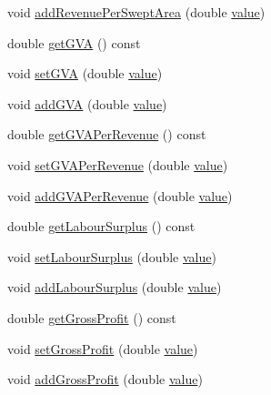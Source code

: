 \begin{DoxyCompactItemize}
\item 
void \mbox{\hyperlink{class_vessel_data_a580e5d2800b1996a473504df4294fd52}{add\+Revenue\+Per\+Swept\+Area}} (double \mbox{\hyperlink{diffusion_8cpp_a4b41795815d9f3d03abfc739e666d5da}{value}})
\item 
double \mbox{\hyperlink{class_vessel_data_ae6043198db6a2a6207ac4c7094efd4ac}{get\+G\+VA}} () const
\item 
void \mbox{\hyperlink{class_vessel_data_a0514e238c51f7f7f500a5c57b6a8ce44}{set\+G\+VA}} (double \mbox{\hyperlink{diffusion_8cpp_a4b41795815d9f3d03abfc739e666d5da}{value}})
\item 
void \mbox{\hyperlink{class_vessel_data_a9d48860436ceb0817cb42cf6e3a785e7}{add\+G\+VA}} (double \mbox{\hyperlink{diffusion_8cpp_a4b41795815d9f3d03abfc739e666d5da}{value}})
\item 
double \mbox{\hyperlink{class_vessel_data_a5bdfdee8005e0c280406f7c27cbd9c3a}{get\+G\+V\+A\+Per\+Revenue}} () const
\item 
void \mbox{\hyperlink{class_vessel_data_a4f4b722abcb52208ee411f268fd4074b}{set\+G\+V\+A\+Per\+Revenue}} (double \mbox{\hyperlink{diffusion_8cpp_a4b41795815d9f3d03abfc739e666d5da}{value}})
\item 
void \mbox{\hyperlink{class_vessel_data_a18af09c8a31920d32e1ab772340661e8}{add\+G\+V\+A\+Per\+Revenue}} (double \mbox{\hyperlink{diffusion_8cpp_a4b41795815d9f3d03abfc739e666d5da}{value}})
\item 
double \mbox{\hyperlink{class_vessel_data_a507bb9c2e218434cdd40b05424efc059}{get\+Labour\+Surplus}} () const
\item 
void \mbox{\hyperlink{class_vessel_data_a98489f1d08600317c877e7aa90e2c286}{set\+Labour\+Surplus}} (double \mbox{\hyperlink{diffusion_8cpp_a4b41795815d9f3d03abfc739e666d5da}{value}})
\item 
void \mbox{\hyperlink{class_vessel_data_a4eae42185398d8330a99f54c006bb253}{add\+Labour\+Surplus}} (double \mbox{\hyperlink{diffusion_8cpp_a4b41795815d9f3d03abfc739e666d5da}{value}})
\item 
double \mbox{\hyperlink{class_vessel_data_a2469bd71a4c49b09f50e5e96a3b4d983}{get\+Gross\+Profit}} () const
\item 
void \mbox{\hyperlink{class_vessel_data_a79c841b831bf1c3b503adb0d048ac4fe}{set\+Gross\+Profit}} (double \mbox{\hyperlink{diffusion_8cpp_a4b41795815d9f3d03abfc739e666d5da}{value}})
\item 
void \mbox{\hyperlink{class_vessel_data_ada6a6f4380bd2a22eafbc6e57b0971e6}{add\+Gross\+Profit}} (double \mbox{\hyperlink{diffusion_8cpp_a4b41795815d9f3d03abfc739e666d5da}{value}})

\end{DoxyCompactItemize}
